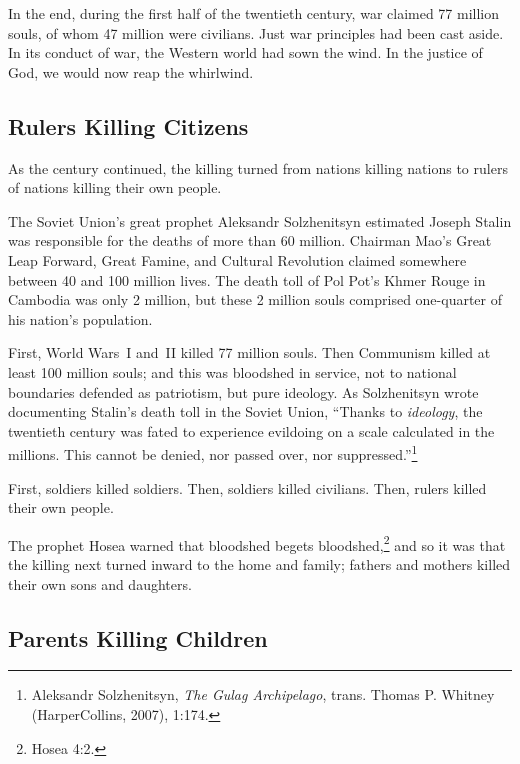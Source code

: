 \documentclass[
]{book}
\begin{document}
In the end, during the first half of the twentieth century, war claimed 77 million souls, of whom 47 million were civilians. Just war principles had been cast aside. In its conduct of war, the Western world had sown the wind. In the justice of God, we would now reap the whirlwind.

\hypertarget{rulers-killing-citizens}{%
\subsection{Rulers Killing Citizens}\label{rulers-killing-citizens}}

As the century continued, the killing turned from nations killing nations to rulers of nations killing their own people.

The Soviet Union's great prophet Aleksandr Solzhenitsyn estimated Joseph Stalin was responsible for the deaths of more than 60 million. Chairman Mao's Great Leap Forward, Great Famine, and Cultural Revolution claimed somewhere between 40 and 100 million lives. The death toll of Pol Pot's Khmer Rouge in Cambodia was only 2 million, but these 2 million souls comprised one-quarter of his nation's population.

First, World Wars~I and~II killed 77 million souls. Then Communism killed at least 100 million souls; and this was bloodshed in service, not to national boundaries defended as patriotism, but pure ideology. As Solzhenitsyn wrote documenting Stalin's death toll in the Soviet Union, ``Thanks to \emph{ideology}, the twentieth century was fated to experience evildoing on a scale calculated in the millions. This cannot be denied, nor passed over, nor suppressed.''\footnote{Aleksandr Solzhenitsyn, \emph{The Gulag Archipelago}, trans. Thomas P. Whitney (HarperCollins, 2007), 1:174.}

First, soldiers killed soldiers. Then, soldiers killed civilians. Then, rulers killed their own people.

The prophet Hosea warned that bloodshed begets bloodshed,\footnote{Hosea 4:2.} and so it was that the killing next turned inward to the home and family; fathers and mothers killed their own sons and daughters.

\hypertarget{parents-killing-children}{%
\subsection{Parents Killing Children}\label{parents-killing-children}}
\end{document}
